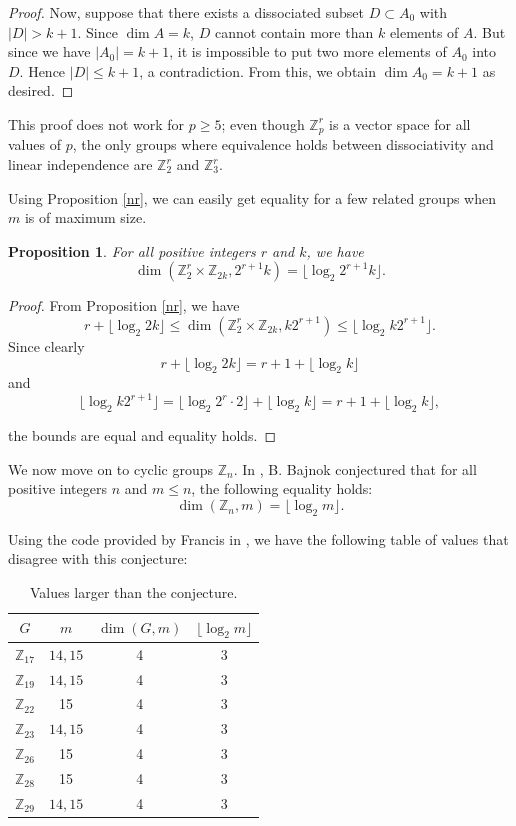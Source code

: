 \documentclass[11pt]{article}
\newcommand{\Z}{\mathbb{Z}}
\newtheorem{prop}[thm]{Proposition}
\begin{document}
\begin{proof}
    Now, suppose that there exists a dissociated subset $D\subset A_0$ with $|D|> k+1$. Since $\dim A =k$,  $D$ cannot contain more than $k$ elements of $A$. But since we have $|A_0|=k+1$, it is impossible to put two more elements of $A_0$ into $D$. Hence $|D|\leq k+1$, a contradiction. From this, we obtain $\dim A_0=k+1$ as desired.
\end{proof}
This proof does not work for $p\geq5$; even though $\Z_p^r$ is a vector space for all values of $p$, the only groups where equivalence holds between dissociativity and linear independence are $\Z_2^r$ and $\Z_3^r$.

\newpage
Using Proposition \ref{nr}, we can easily get equality for a few related groups when $m$ is of maximum size.



\begin{prop}
For all positive integers $r$ and $k$, we have
\[\dim(\Z_2^r\times\Z_{2k},2^{r+1}k)=\lfloor\log_2 2^{r+1}k\rfloor.\]
\end{prop}
\begin{proof}
    From Proposition \ref{nr}, we have
    \[r+\lfloor\log_2 2k\rfloor\leq\dim(\Z_2^r\times\Z_{2k},k2^{r+1})\leq\lfloor\log_2 k2^{r+1}\rfloor.\]
    Since clearly
    \[r+\lfloor\log_2 2k\rfloor=r+1+\lfloor\log_2 k\rfloor\]
    and
    \[\lfloor\log_2 k2^{r+1}\rfloor=\lfloor\log_2 2^r\cdot 2\rfloor+\lfloor\log_2 k\rfloor=r+1+\lfloor\log_2 k\rfloor,\]
    
    \noindent the bounds are equal and equality holds.
\end{proof}


We now move on to cyclic groups $\Z_n$. In \cite{bb}, B. Bajnok conjectured that for all positive integers $n$ and $m\leq n$, the following equality holds:
\[\dim(\Z_n,m)=\lfloor \log_2 m\rfloor.\]

Using the code provided by Francis in \cite{peter}, we have the following table of values that disagree with this conjecture:

\vspace{1em}
\begin{table}[h!]
\centering
\begin{tabular}{c|c|c|c}
$G$  & $m$ & $\dim(G, m)$ & $\lfloor \log_2 m\rfloor$\\ \hline
$\Z_{17}$ & $14,15$ & 4   & 3 \\ \hline
$\Z_{19}$ & $14,15$ & 4   & 3        \\ \hline
$\Z_{22}$ & 15      & 4   & 3      \\ \hline
$\Z_{23}$ & $14,15$ & 4   & 3      \\ \hline
$\Z_{26}$ & 15      & 4     & 3     \\ \hline
$\Z_{28}$ & 15      & 4    & 3    \\ \hline
$\Z_{29}$ & $14,15$ & 4   & 3           
\end{tabular}
\caption{Values larger than the conjecture.}
\end{table}
\vspace{1em}
\end{document}

